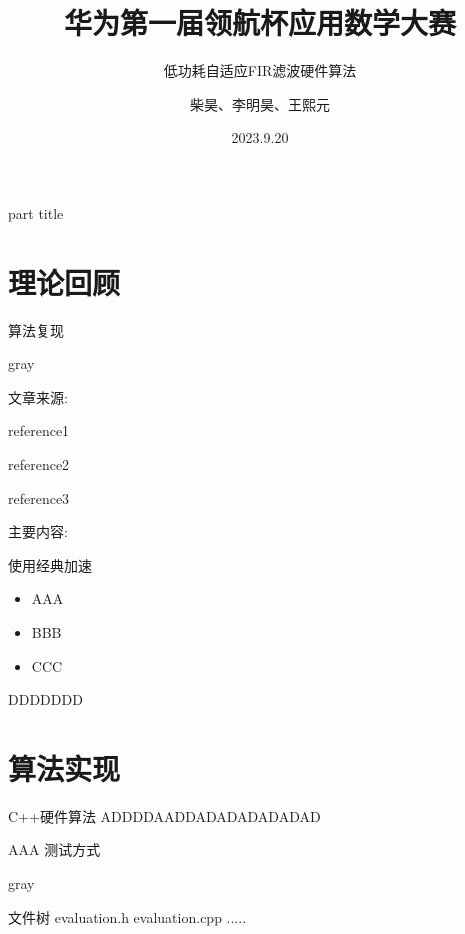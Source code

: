 \documentclass[8pt]{ctexbeamer}
\title{华为第一届领航杯应用数学大赛}
\subtitle{低功耗自适应FIR滤波硬件算法}
\date{2023.9.20}
\author{柴昊、李明昊、王熙元}
\institute{复旦大学\\
	南京大学}
\renewenvironment{quote}
{
	\begin{notebox}{gray}
}
{
	\end{notebox}
}
\begin{document}
\begin{frame}
	\titlepage
\end{frame}

\begin{frame}[plain]
	\begin{beamercolorbox}[sep=12pt,center]{part title}
		{\Large	\contentsname}		
	\end{beamercolorbox}
    \tableofcontents
\end{frame}

\section{理论回顾}


\begin{frame}{算法复现}
	\begin{quote}
		文章来源:
		
		reference1

		reference2

		reference3

	\end{quote}
	主要内容:

	使用经典加速

	\begin{itemize}
		\item AAA
		\item BBB
		\item CCC
	\end{itemize}

	DDDDDDD

\end{frame}


\section{算法实现}

\begin{frame}{C++硬件算法}
	ADDDDAADDADADADADADAD

	\begin{block}{AAA}
		测试方式
	\end{block}
	\begin{quote}
		文件树
		evaluation.h
		evaluation.cpp
		.....

	\end{quote}
\end{frame}
\end{document}
